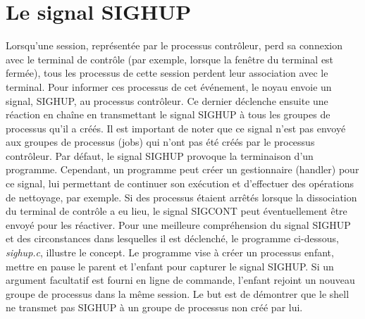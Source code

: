 \section{Le signal SIGHUP}

Lorsqu'une session, représentée par le processus contrôleur, perd sa connexion avec le terminal de contrôle (par exemple, lorsque la fenêtre du terminal est fermée), tous les processus de cette session perdent leur association avec le terminal.
Pour informer ces processus de cet événement, le noyau envoie un signal, SIGHUP, au processus contrôleur. Ce dernier déclenche ensuite une réaction en chaîne en transmettant le signal SIGHUP à tous les groupes de processus qu'il a créés. 
Il est important de noter que ce signal n'est pas envoyé aux groupes de processus (jobs) qui n'ont pas été créés par le processus contrôleur.
\newline
Par défaut, le signal SIGHUP provoque la terminaison d'un programme. Cependant, un programme peut créer un gestionnaire (handler) pour ce signal, lui permettant de continuer son exécution et d'effectuer des opérations de nettoyage, par exemple.
 Si des processus étaient arrêtés lorsque la dissociation du terminal de contrôle a eu lieu, le signal SIGCONT peut éventuellement être envoyé pour les réactiver.
\newline
Pour une meilleure compréhension du signal SIGHUP et des circonstances dans lesquelles il est déclenché, le programme ci-dessous, \textit{sighup.c}, illustre le concept. Le programme vise à créer un processus enfant, mettre en pause le parent et l'enfant pour capturer 
le signal SIGHUP. Si un argument facultatif est fourni en ligne de commande, l'enfant rejoint un nouveau groupe de processus dans la même session. Le but est de démontrer que le shell ne transmet pas SIGHUP à un groupe de processus non créé par lui. 

